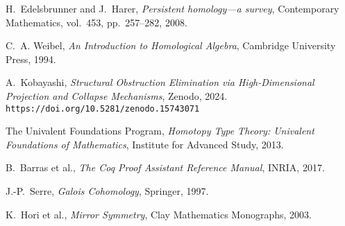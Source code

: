 \documentclass[11pt]{article}
\begin{document}
\begin{thebibliography}{99}

H.~Edelsbrunner and J.~Harer, \emph{Persistent homology---a survey}, 
Contemporary Mathematics, vol.~453, pp.~257--282, 2008.

C.~A. Weibel, \emph{An Introduction to Homological Algebra}, 
Cambridge University Press, 1994.

A.~Kobayashi, \emph{Structural Obstruction Elimination via High-Dimensional Projection and Collapse Mechanisms}, Zenodo, 2024.\\
\texttt{https://doi.org/10.5281/zenodo.15743071}

The Univalent Foundations Program, \emph{Homotopy Type Theory: Univalent Foundations of Mathematics}, Institute for Advanced Study, 2013.

B.~Barras et al., \emph{The Coq Proof Assistant Reference Manual}, INRIA, 2017.

J.-P.~Serre, \emph{Galois Cohomology}, Springer, 1997.

K.~Hori et al., \emph{Mirror Symmetry}, Clay Mathematics Monographs, 2003.


\end{thebibliography}
\end{document}
